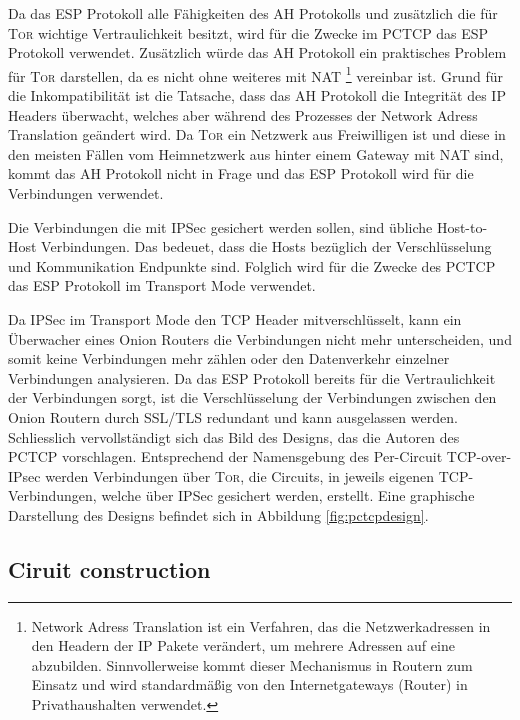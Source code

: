 \documentclass[fleqn,envcountsame,runningheads,10pt,a4paper]{llncs}
\begin{document}
Da das ESP Protokoll alle Fähigkeiten des AH Protokolls und zusätzlich die für \textsc{Tor} wichtige Vertraulichkeit besitzt, wird für die Zwecke im PCTCP das ESP Protokoll verwendet. Zusätzlich würde das AH Protokoll ein praktisches Problem für \textsc{Tor} darstellen, da es nicht ohne weiteres mit NAT \footnote{Network Adress Translation \cite{rfc:nat} ist ein Verfahren, das die Netzwerkadressen in den  Headern der IP Pakete verändert, um mehrere Adressen auf eine abzubilden. Sinnvollerweise kommt dieser Mechanismus in Routern zum Einsatz und wird standardmäßig von den Internetgateways (Router) in Privathaushalten verwendet.}  vereinbar ist. Grund für die Inkompatibilität ist die Tatsache, dass das AH Protokoll die Integrität des IP Headers überwacht, welches aber während des Prozesses der Network Adress Translation geändert wird. Da \textsc{Tor} ein Netzwerk aus Freiwilligen ist und diese in den meisten Fällen vom Heimnetzwerk aus hinter einem Gateway mit NAT sind, kommt das AH Protokoll nicht in Frage und das ESP Protokoll wird für die Verbindungen verwendet.

Die Verbindungen die mit IPSec gesichert werden sollen, sind übliche Host-to-Host Verbindungen. Das bedeuet, dass die Hosts bezüglich der Verschlüsselung und Kommunikation Endpunkte sind. Folglich wird für die Zwecke des PCTCP das ESP Protokoll im Transport Mode verwendet.

Da IPSec im Transport Mode den TCP Header mitverschlüsselt, kann ein Überwacher eines Onion Routers die Verbindungen nicht mehr unterscheiden, und somit keine Verbindungen mehr zählen oder den Datenverkehr einzelner Verbindungen analysieren. Da das ESP Protokoll bereits für die Vertraulichkeit der Verbindungen sorgt, ist die Verschlüsselung der Verbindungen zwischen den Onion Routern durch SSL/TLS redundant und kann ausgelassen werden. Schliesslich vervollständigt sich das Bild des Designs, das die Autoren des PCTCP vorschlagen. Entsprechend der Namensgebung des Per-Circuit TCP-over-IPsec werden Verbindungen über \textsc{Tor}, die Circuits, in jeweils eigenen TCP-Verbindungen, welche über IPSec gesichert werden, erstellt. Eine graphische Darstellung des Designs befindet sich in Abbildung \ref{fig:pctcpdesign}.

\subsection{Ciruit construction}
\end{document}
